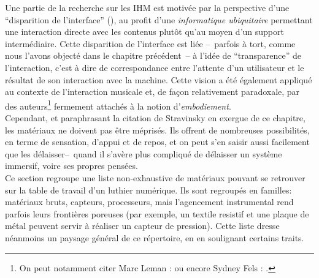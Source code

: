 \noindent Une partie de la recherche sur les \gls{IHM} est motivée par la perspective d'une ``disparition de l'interface'' (\cite{weiser_computer_1991, dey_distributed_2001, hui_towards_2017}), au profit d'une \textit{informatique ubiquitaire} permettant une interaction directe avec les contenus plutôt qu'au moyen d'un support intermédiaire. Cette disparition de l'interface est liée --~parfois à tort, comme nous l'avons objecté dans le chapitre précédent~-- à l'idée de ``transparence'' de l'interaction, c'est à dire de correspondance entre l'attente d'un utilisateur et le résultat de son interaction avec la machine. Cette vision a été également appliqué au contexte de l'interaction musicale et, de façon relativement paradoxale, par des auteurs\footnote{On peut notamment citer Marc Leman : \cite{leman_embodied_2008} ou encore Sydney Fels :  \cite{fels_mapping_2002}.} fermement attachés à la notion d'\textit{embodiement}.\\
\indent Cependant, et paraphrasant la citation de Stravinsky en exergue de ce chapitre, les matériaux ne doivent pas être méprisés. Ils offrent de nombreuses possibilités, en terme de sensation, d'appui et de repos, et on peut s'en saisir aussi facilement que les délaisser--~quand il s'avère plus compliqué de délaisser un système immersif, voire ses propres pensées.\\
\indent Ce section regroupe une liste non-exhaustive de matériaux pouvant se retrouver sur la table de travail d'un luthier numérique. Ils sont regroupés en familles: matériaux bruts, capteurs, processeurs, mais l'agencement instrumental rend parfois leurs frontières poreuses (par exemple, un textile resistif et une plaque de métal peuvent servir à réaliser un capteur de pression). Cette liste dresse néanmoins un paysage général de ce répertoire, en en soulignant certains traits.

